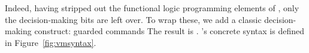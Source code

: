 \documentclass[article,screen,12pt, nonacm]{acmart}
\begin{document}
        
        


        Indeed, having stripped out the functional logic programming elements of
        \VC, only the decision-making bits are left over. To wrap these, we add
        a classic decision-making construct: guarded commands\cite{dijkstra} The
        result is \VMinus. \VMinus's concrete syntax is defined in
        Figure~\ref{fig:vmsyntax}. 

        
\end{document}
